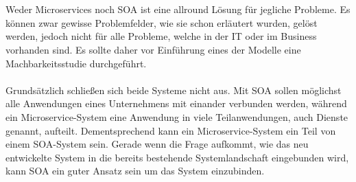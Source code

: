 \\\\
Weder Microservices noch SOA ist eine allround Lösung für jegliche Probleme. Es können zwar gewisse Problemfelder, wie sie schon erläutert wurden, gelöst werden, jedoch nicht für alle Probleme, welche in der IT oder im Business vorhanden sind. Es sollte daher vor Einführung eines der Modelle eine Machbarkeitsstudie durchgeführt.
\\\\
Grundsätzlich schließen sich beide Systeme nicht aus. Mit SOA sollen möglichst alle Anwendungen eines Unternehmens mit einander verbunden werden, während ein Microservice-System eine Anwendung in viele Teilanwendungen, auch Dienste genannt, aufteilt. Dementsprechend kann ein Microservice-System ein Teil von einem SOA-System sein. Gerade wenn die Frage aufkommt, wie das neu entwickelte System in die bereits bestehende Systemlandschaft eingebunden wird, kann SOA ein guter Ansatz sein um das System einzubinden.